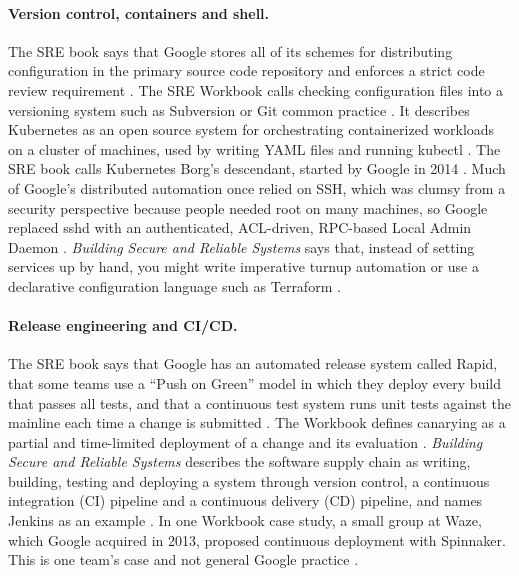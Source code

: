\paragraph{Version control, containers and shell.}
The SRE book says that Google stores all of its schemes for distributing configuration in the primary source code repository and enforces a strict code review requirement \cite{sre-book}. The SRE Workbook calls checking configuration files into a versioning system such as Subversion or Git common practice \cite{workbook}. It describes Kubernetes as an open source system for orchestrating containerized workloads on a cluster of machines, used by writing YAML files and running kubectl \cite{workbook}. The SRE book calls Kubernetes Borg's descendant, started by Google in 2014 \cite{sre-book}. Much of Google's distributed automation once relied on SSH, which was clumsy from a security perspective because people needed root on many machines, so Google replaced sshd with an authenticated, ACL-driven, RPC-based Local Admin Daemon \cite{sre-book}. \emph{Building Secure and Reliable Systems} says that, instead of setting services up by hand, you might write imperative turnup automation or use a declarative configuration language such as Terraform \cite{bsrs}.

\paragraph{Release engineering and CI/CD.}
The SRE book says that Google has an automated release system called Rapid, that some teams use a ``Push on Green'' model in which they deploy every build that passes all tests, and that a continuous test system runs unit tests against the mainline each time a change is submitted \cite{sre-book}. The Workbook defines canarying as a partial and time-limited deployment of a change and its evaluation \cite{workbook}. \emph{Building Secure and Reliable Systems} describes the software supply chain as writing, building, testing and deploying a system through version control, a continuous integration (CI) pipeline and a continuous delivery (CD) pipeline, and names Jenkins as an example \cite{bsrs}. In one Workbook case study, a small group at Waze, which Google acquired in 2013, proposed continuous deployment with Spinnaker. This is one team's case and not general Google practice \cite{workbook}.

